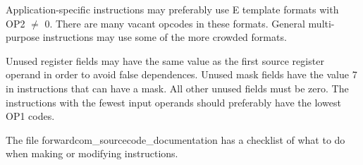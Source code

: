 \documentclass[forwardcom.tex]{subfiles}
\begin{document}
Application-specific instructions may preferably use E template formats with OP2 $\neq$ 0. There are many vacant opcodes in these formats. General multi-purpose instructions may use some of the more crowded formats.
\vv

Unused register fields may have the same value as the first source register operand in order to avoid false dependences. Unused mask fields have the value 7 in instructions that can have a mask.
All other unused fields must be zero. The instructions with the fewest input operands should preferably have the lowest OP1 codes. 
\vv

The file forwardcom\_sourcecode\_documentation has a checklist of what to do when making or modifying instructions.
\vv
\end{document}
